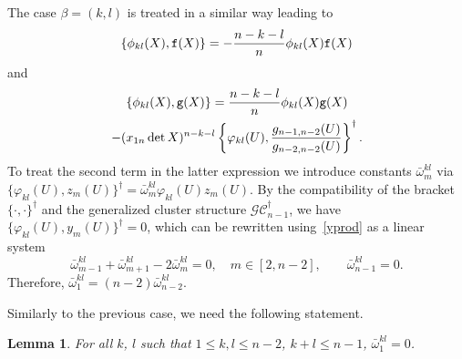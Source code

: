\documentclass{amsart}
\newtheorem{lemma}[theorem]{Lemma}
\theoremstyle{definition}
\theoremstyle{remark}
\numberwithin{equation}{section}
\numberwithin{theorem}{section}
\def\CC{{\mathcal C}}
\def\G{{\mathcal G}}
\def\ef{{\tt f}}
\def\eg{{\tt g}}
\def\fy{\varphi}
\def\Poi{{\{{\cdot},{\cdot}\}}}
\begin{document}
The case $\beta=(k,l)$ is treated in a similar way leading to
\[
\{\phi_{kl}(X),\ef(X)\}=-\frac{n-k-l}n\phi_{kl}(X)\ef(X)
\]
and
\begin{multline*}
\{\phi_{kl}(X),\eg(X)\}=\frac{n-k-l}n\phi_{kl}(X)\eg(X)\\-
(x_{1n}\det X)^{n-k-l}\left\{\fy_{kl}(U),\frac{g_{n-1,n-2}(U)}{g_{n-2,n-2}(U)}\right\}^\dag.
\end{multline*}
To treat the second term in the latter expression we introduce constants $\bar\omega_m^{kl}$ via $\{\fy_{kl}(U),z_m(U)\}^\dag=\bar\omega_m^{kl}\fy_{kl}(U)z_m(U)$. By the compatibility of the bracket $\Poi^\dag$ and the generalized cluster structure $\G\CC_{n-1}^\dag$, we have $\{\fy_{kl}(U),y_m(U)\}^\dag=0$, which can be rewritten using~\eqref{yprod} as a linear system
\[
\bar\omega_{m-1}^{kl}+\bar\omega_{m+1}^{kl}-2\bar\omega_m^{kl}=0,\quad m\in[2,n-2],\qquad \bar\omega_{n-1}^{kl}=0.
\]
Therefore, $\bar\omega_1^{kl}=(n-2)\bar\omega_{n-2}^{kl}$.

Similarly to the previous case, we need the following statement.

\begin{lemma}\label{baromega1}
For all $k$, $l$ such that $1\le k,l\le n-2$, $k+l\le n-1$, $\bar\omega_1^{kl}=0$.
\end{lemma}
\end{document}

